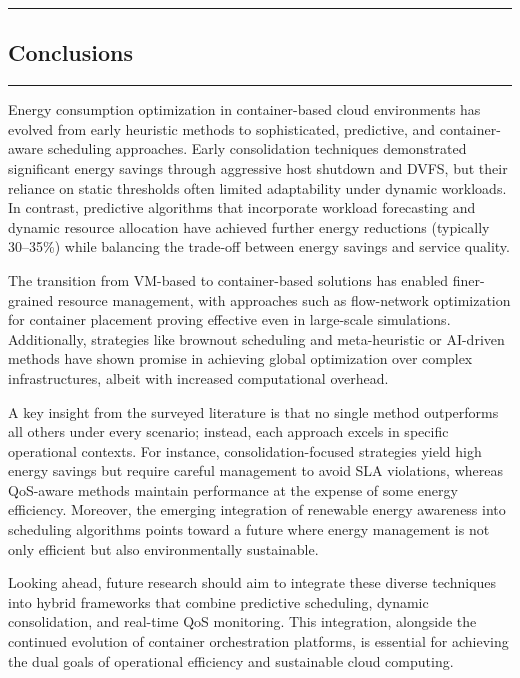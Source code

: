 {\color{gray}\hrule}
\begin{center}
\section{Conclusions}
\bigskip
\end{center}
{\color{gray}\hrule}
\vspace{0.5cm}

\begin{multicols}{2}
Energy consumption optimization in container-based cloud environments has evolved from early heuristic methods to sophisticated, predictive, and container-aware scheduling approaches. Early consolidation techniques demonstrated significant energy savings through aggressive host shutdown and DVFS, but their reliance on static thresholds often limited adaptability under dynamic workloads\cite{carrega_energy-aware_2017}. In contrast, predictive algorithms that incorporate workload forecasting and dynamic resource allocation have achieved further energy reductions (typically 30--35\%) while balancing the trade-off between energy savings and service quality\cite{dabbagh_energy-efficient_2015,bui_energy_2017}.

The transition from VM-based to container-based solutions has enabled finer-grained resource management, with approaches such as flow-network optimization for container placement proving effective even in large-scale simulations\cite{hu_concurrent_2020}. Additionally, strategies like brownout scheduling\cite{xu_energy_2016} and meta-heuristic or AI-driven methods\cite{tan_hybrid_2019,shi_energy-aware_2018} have shown promise in achieving global optimization over complex infrastructures, albeit with increased computational overhead.

A key insight from the surveyed literature is that no single method outperforms all others under every scenario; instead, each approach excels in specific operational contexts. For instance, consolidation-focused strategies yield high energy savings but require careful management to avoid SLA violations, whereas QoS-aware methods maintain performance at the expense of some energy efficiency\cite{li_sla-aware_2018}. Moreover, the emerging integration of renewable energy awareness into scheduling algorithms\cite{kumar_renewable_2019} points toward a future where energy management is not only efficient but also environmentally sustainable.

Looking ahead, future research should aim to integrate these diverse techniques into hybrid frameworks that combine predictive scheduling, dynamic consolidation, and real-time QoS monitoring. This integration, alongside the continued evolution of container orchestration platforms, is essential for achieving the dual goals of operational efficiency and sustainable cloud computing.
\end{multicols}